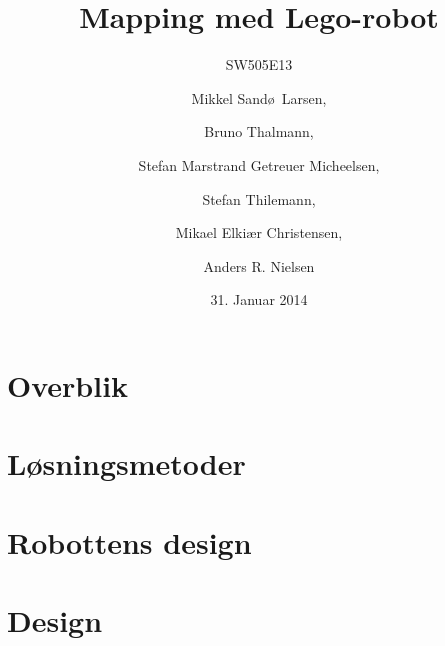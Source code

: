 \documentclass{beamer}
\title[Mapping med Lego-robot]{Mapping med Lego-robot}
\subtitle{SW505E13}
\author[SW505E13]{Mikkel Sand\o ~Larsen, \and Bruno Thalmann, \and Stefan Marstrand Getreuer Micheelsen, \and Stefan Thilemann, \and Mikael Elki\ae r Christensen, \and Anders R. Nielsen}
\institute[Aalborg University]
{
  Department of Computer Science\\
  Aalborg University}
\date[CFP 2003]{31. Januar 2014}
\begin{document}

\begin{frame}
  \titlepage
\end{frame}

\section{Overblik}



\section{Løsningsmetoder}

\section{Robottens design}





\section{Design}


\end{document}
